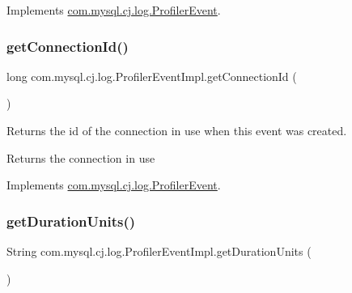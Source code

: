 Implements \mbox{\hyperlink{interfacecom_1_1mysql_1_1cj_1_1log_1_1_profiler_event_a234f6be623335bd2510e74220d71c526}{com.\+mysql.\+cj.\+log.\+Profiler\+Event}}.

\mbox{\label{classcom_1_1mysql_1_1cj_1_1log_1_1_profiler_event_impl_ac9658ff85b167806a14fb3496d97372b}} 
\subsubsection{\texorpdfstring{get\+Connection\+Id()}{getConnectionId()}}
{\footnotesize\ttfamily long com.\+mysql.\+cj.\+log.\+Profiler\+Event\+Impl.\+get\+Connection\+Id (\begin{DoxyParamCaption}{ }\end{DoxyParamCaption})}

Returns the id of the connection in use when this event was created.

\begin{DoxyReturn}{Returns}
the connection in use 
\end{DoxyReturn}


Implements \mbox{\hyperlink{interfacecom_1_1mysql_1_1cj_1_1log_1_1_profiler_event_ac1990bb68ea1968dc7c432523e822fab}{com.\+mysql.\+cj.\+log.\+Profiler\+Event}}.

\mbox{\label{classcom_1_1mysql_1_1cj_1_1log_1_1_profiler_event_impl_a412e4b084f1c75d2ce0043bef41c2647}} 
\subsubsection{\texorpdfstring{get\+Duration\+Units()}{getDurationUnits()}}
{\footnotesize\ttfamily String com.\+mysql.\+cj.\+log.\+Profiler\+Event\+Impl.\+get\+Duration\+Units (\begin{DoxyParamCaption}{ }\end{DoxyParamCaption})}

